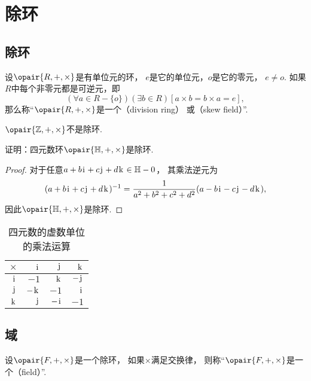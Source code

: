 \section{除环}
\subsection{除环}
\begin{definition}
设\(\opair{R,+,\times}\)是有单位元的环，
\(e\)是它的单位元，\(o\)是它的零元，
\(e \neq o\).
如果\(R\)中每个非零元都是可逆元，即\[
	(\forall a \in R-\{o\})(\exists b \in R)[a \times b = b \times a = e],
\]
那么称“\(\opair{R,+,\times}\)是一个（division ring）
或（skew field）”.
\end{definition}

\(\opair{\mathbb{Z},+,\times}\)不是除环.

\begin{example}
证明：四元数环\(\opair{\mathbb{H},+,\times}\)是除环.
\begin{proof}
对于任意\(a+b\kern1pt\mathrm{i}\kern1pt+c\kern1pt\mathrm{j}\kern1pt+d\kern1pt\mathrm{k}\kern1pt\in\mathbb{H}-0\)，
其乘法逆元为\[
	(a+b\kern1pt\mathrm{i}\kern1pt+c\kern1pt\mathrm{j}\kern1pt+d\kern1pt\mathrm{k}\kern1pt)^{-1}
	= \frac1{a^2+b^2+c^2+d^2} (a-b\kern1pt\mathrm{i}\kern1pt-c\kern1pt\mathrm{j}\kern1pt-d\kern1pt\mathrm{k}\kern1pt),
\]
因此\(\opair{\mathbb{H},+,\times}\)是除环.
\end{proof}
\end{example}

\begin{table}[hbt]
	\centering
	\begin{tabular}{r|*3r}
		\(\times\) & \(\kern1pt\mathrm{i}\kern1pt\) & \(\kern1pt\mathrm{j}\kern1pt\) & \(\kern1pt\mathrm{k}\kern1pt\) \\ \hline
		\(\kern1pt\mathrm{i}\kern1pt\) & \(-1\) & \(\kern1pt\mathrm{k}\kern1pt\) & \(-\kern1pt\mathrm{j}\kern1pt\) \\
		\(\kern1pt\mathrm{j}\kern1pt\) & \(-\kern1pt\mathrm{k}\kern1pt\) & \(-1\) & \(\kern1pt\mathrm{i}\kern1pt\) \\
		\(\kern1pt\mathrm{k}\kern1pt\) & \(\kern1pt\mathrm{j}\kern1pt\) & \(-\kern1pt\mathrm{i}\kern1pt\) & \(-1\) \\
	\end{tabular}
	\caption{四元数的虚数单位的乘法运算}
\end{table}

\subsection{域}
\begin{definition}
设\(\opair{F,+,\times}\)是一个除环，
如果\(\times\)满足交换律，
则称“\(\opair{F,+,\times}\)是一个（field）”.
\end{definition}

